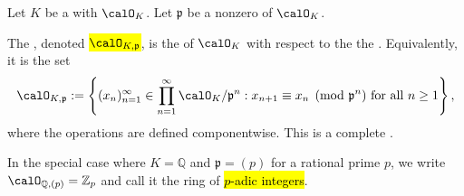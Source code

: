 \begin{definition}\label{definition:p_adic_integers_for_a_nonzero_prime_of_a_number_field}
    Let $K$ be a  with  $\calO_K$. Let $\mathfrak{p}$ be a nonzero  of $\calO_K$.

    The , denoted \hl{$\calO_{K,\mathfrak{p}}$}, is the  of $\calO_K$ with respect to the  the . Equivalently, it is the set
    $$
        \calO_{K,\mathfrak{p}} := \left\{ (x_n)_{n=1}^\infty \in \prod_{n=1}^\infty \calO_K/\mathfrak{p}^n : x_{n+1} \equiv x_n \pmod{\mathfrak{p}^n} \text{ for all } n \geq 1 \right\},
    $$
    where the operations are defined componentwise. This is a complete .

    In the special case where $K = \mathbb{Q}$ and $\mathfrak{p} = (p)$ for a rational prime $p$, we write $\calO_{\mathbb{Q},(p)} = \mathbb{Z}_p$ and call it the ring of \hl{$p$-adic integers}.
\end{definition}
